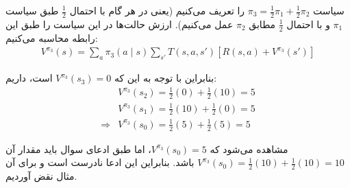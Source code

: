 سیاست $\pi_3 = \frac{1}{2}\pi_1 + \frac{1}{2}\pi_2$ را تعریف می‌کنیم (یعنی در هر گام با احتمال $\frac{1}{2}$ طبق سیاست $\pi_1$ و با احتمال $\frac{1}{2}$ مطابق $\pi_2$ عمل می‌کنیم). ارزش حالت‌ها در این سیاست را طبق این رابطه محاسبه می‌کنیم:
\begin{align*}
    V^{\pi_3}(s) = \sum_{a} \pi_3(a \mid s) \sum_{s'} T(s, a, s') \left[ R(s, a) + V^{\pi_3}(s') \right]
\end{align*}

بنابراین با توجه به این که $V^{\pi_3}(s_3) = 0$ است، داریم:
\begin{align*}
                & V^{\pi_3}(s_2) = \frac{1}{2}(0) + \frac{1}{2}(10) = 5 \\
                & V^{\pi_3}(s_1) = \frac{1}{2}(10) + \frac{1}{2}(0) = 5 \\
    \Rightarrow & V^{\pi_3}(s_0) = \frac{1}{2}(5) + \frac{1}{2}(5) = 5
\end{align*}

مشاهده می‌شود که $V^{\pi_3}(s_0) = 5$، اما طبق ادعای سوال باید مقدار آن $V^{\pi_3}(s_0) = \frac{1}{2}(10) + \frac{1}{2}(10) = 10$ باشد. بنابراین این ادعا نادرست است و برای آن مثال نقض آوردیم.